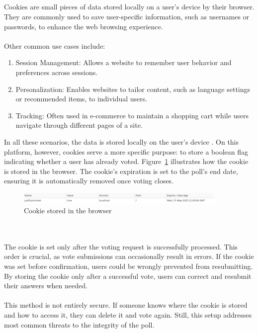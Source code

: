\documentclass[a4paper,12pt]{report}
\begin{document}
\\ \\ \\ \\
Cookies are small pieces of data stored locally on a user’s device by their browser. They are commonly used to save user-specific information, such as usernames or passwords, to enhance the web browsing experience. \\ \\
 Other common use cases include:
\begin{enumerate} \item Session Management: Allows a website to remember user behavior and preferences across sessions. \item Personalization: Enables websites to tailor content, such as language settings or recommended items, to individual users. \item Tracking: Often used in e-commerce to maintain a shopping cart while users navigate through different pages of a site. \end{enumerate}
In all these scenarios, the data is stored locally on the user's device \parencite{cookies}.
On this platform, however, cookies serve a more specific purpose: to store a boolean flag indicating whether a user has already voted. Figure~\ref{fig:cookie} illustrates how the cookie is stored in the browser. The cookie’s expiration is set to the poll’s end date, ensuring it is automatically removed once voting closes.
\begin{figure}[h!] 
	\centering 
	\includegraphics[width=0.9\textwidth]{pics/cookie.png} 
	\caption{Cookie stored in the browser} 
	\label{fig:cookie} 
\end{figure}\\ \\
The cookie is set only after the voting request is successfully processed. This order is crucial, as vote submissions can occasionally result in errors. If the cookie was set before confirmation, users could be wrongly prevented from resubmitting. By storing the cookie only after a successful vote, users can correct and resubmit their answers when needed.\\ \\
This method is not entirely secure. If someone knows where the cookie is stored and how to access it, they can delete it and vote again. Still, this setup addresses most common threats to the integrity of the poll.
\end{document}
